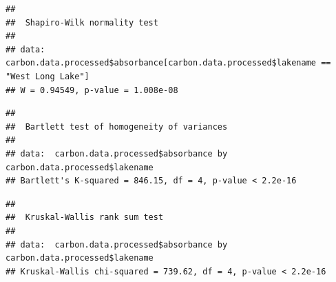 \documentclass[12pt,]{article}
\newenvironment{Shaded}{\begin{snugshade}}{\end{snugshade}}
\newcommand{\KeywordTok}[1]{\textcolor[rgb]{0.13,0.29,0.53}{\textbf{#1}}}
\newcommand{\StringTok}[1]{\textcolor[rgb]{0.31,0.60,0.02}{#1}}
\newcommand{\CommentTok}[1]{\textcolor[rgb]{0.56,0.35,0.01}{\textit{#1}}}
\newcommand{\OperatorTok}[1]{\textcolor[rgb]{0.81,0.36,0.00}{\textbf{#1}}}
\newcommand{\NormalTok}[1]{#1}
\begin{document}
\begin{Shaded}
\end{Shaded}

\begin{verbatim}
## 
##  Shapiro-Wilk normality test
## 
## data:  carbon.data.processed$absorbance[carbon.data.processed$lakename ==     "West Long Lake"]
## W = 0.94549, p-value = 1.008e-08
\end{verbatim}

\begin{Shaded}
\end{Shaded}

\begin{verbatim}
## 
##  Bartlett test of homogeneity of variances
## 
## data:  carbon.data.processed$absorbance by carbon.data.processed$lakename
## Bartlett's K-squared = 846.15, df = 4, p-value < 2.2e-16
\end{verbatim}

\begin{Shaded}
\end{Shaded}

\begin{verbatim}
## 
##  Kruskal-Wallis rank sum test
## 
## data:  carbon.data.processed$absorbance by carbon.data.processed$lakename
## Kruskal-Wallis chi-squared = 739.62, df = 4, p-value < 2.2e-16
\end{verbatim}
\end{document}
